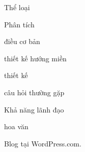 Thể loại

Phân tích

điều cơ bản

thiết kế hướng miền

thiết kế

câu hỏi thường gặp

Khả năng lãnh đạo

hoa văn

Blog tại WordPress.com.













% 

% 












